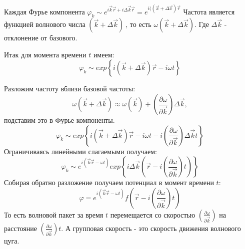 \documentclass[14pt,a4paper,oneside]{extarticle}	%
\newcommand{\bracket}[1] {\left( #1 \right) } %
\newcommand{\dif}[2] {\bracket{ \frac{\partial #1}{\partial #2} }}
\begin{document}
Каждая Фурье компонента $ \varphi_{k}\sim e^{i\vec{k}\vec{r} + i\Delta\vec{k}\vec{r}}=e^{i((\vec{x}+\Delta\vec{x})\vec{r}} $
Частота является функцией волнового числа $ (\vec{k} + \Delta\vec{k}) \:$, то есть $ \omega(\vec{k} + \Delta\vec{k}) $. Где $ \Delta\vec{k} $ - отклонение от базового.

Итак для момента времени $ t $ имеем:
\begin{equation*}
\varphi_{k}\sim exp\left\lbrace i(\vec{k} + \Delta\vec{k})\vec{r}- i\omega t\right\rbrace 
\end{equation*}

Разложим частоту вблизи базовой частоты:
\begin{equation*}
\omega(\vec{k} + \Delta\vec{k})\approx \omega(\vec{k}) +\dif{\omega}{\vec{k}}\Delta\vec{k},
\end{equation*}
 подставим это в Фурье компоненты.
\begin{equation*}
\varphi_{k}\sim exp\left\lbrace i(\vec{k} + \Delta\vec{k})\vec{r}- i\omega t - i\dif{\omega}{\vec{k}}\Delta\vec{k}t \right\rbrace 
\end{equation*}
 Ограничиваясь линейными слагаемыми получаем:
\begin{equation*}
\varphi_{k}\sim e^{i(\vec{k}\vec{r}-\omega t)} 
exp\left\lbrace i\Delta\vec{k}(\vec{r} - i\dif{\omega}{\vec{k}}t) \right\rbrace 
\end{equation*}
Собирая обратно разложение получаем потенциал в момент времени $ t $:
\begin{equation*}
\varphi = e^{i(\vec{k}\vec{r}-\omega t)} f\left(\vec{r} - i\dif{\omega}{\vec{k}}t \right) 
\end{equation*}
То есть волновой пакет за время $ t $ перемещается со скоростью $ \dif{\omega}{\vec{k}} $ на расстояние $ \dif{\omega}{\vec{k}}t $.
А групповая скорость - это скорость движения волнового цуга.
\end{document}
